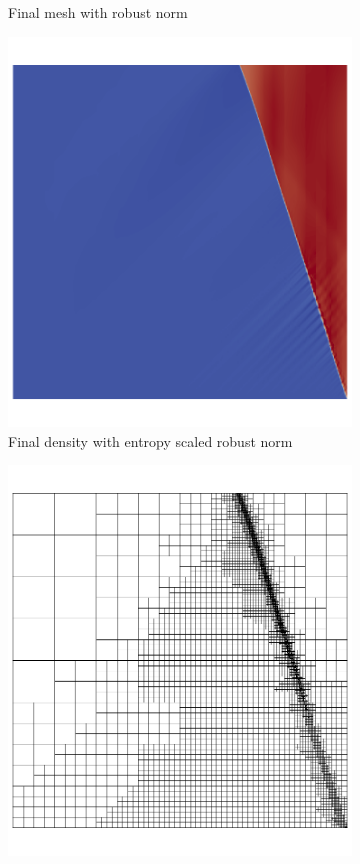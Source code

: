 \documentclass[Dissertation.tex]{subfiles}
\begin{document}
\begin{figure}[ht]
\begin{subfigure}[t]{0.45\textwidth}
\caption{Final mesh with robust norm}
\end{subfigure}
\begin{subfigure}[t]{0.45\textwidth}
\centering
\includegraphics[width=\textwidth]{Dissertation/Noh/EntropyRobust-den10.png}
\caption{Final density with entropy scaled robust norm}
\end{subfigure}
\begin{subfigure}[t]{0.45\textwidth}
\centering
\includegraphics[width=\textwidth]{Dissertation/Noh/EntropyRobust-meshonly10.png}

\end{subfigure}
\end{figure}
\end{document}
